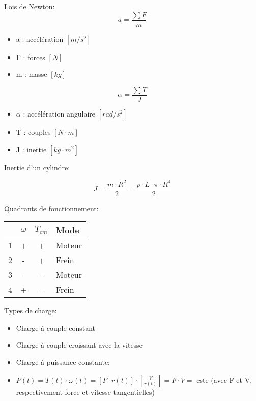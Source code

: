 \documentclass[10pt]{article} %
\begin{document}
\begin{multicols}{3}
\begin{flushleft}
				Lois de Newton:
				\[a = \frac{\sum F}{m}\]
				
				\begin{itemize}
					\item a : accélération $[m/s^2]$
					\item F : forces $[N]$
					\item m : masse $[kg]$
				\end{itemize}
		
				\[\alpha = \frac{\sum T}{J} \]
		
				\begin{itemize} 
					\item $\alpha$ : accélération angulaire $[rad/s^2]$
					\item T : couples $[N \cdot m]$
					\item J : inertie $[kg \cdot m^2]$
				\end{itemize}
		
				Inertie d'un cylindre:
				
				\[ J = \frac{m \cdot R^2}{2} = \frac{\rho \cdot L \cdot \pi \cdot R^4}{2} \]
				
				Quadrants de fonctionnement:
				
				\begin{table}[H]
				\begin{tabular}{|c|c|c|l|}
				\hline
					& $\omega$ & $T_{em}$ & Mode   \\ \hline
				1 & +        & +        & Moteur \\ \hline
				2 & -        & +        & Frein  \\ \hline
				3 & -        & -        & Moteur \\ \hline
				4 & +        & -        & Frein  \\ \hline
				\end{tabular}
				\centering
				\end{table}
				
				Types de charge:
				
				\begin{itemize}
					\item Charge à couple constant
					\item Charge à couple croissant avec la vitesse
					\item Charge à puissance constante:
					\item [] $P(t)=T(t) \cdot \omega(t)=[F \cdot r(t)] \cdot\left[\frac{V}{r(t)}\right]=F \cdot V=$ cste (avec F et V, respectivement force et vitesse tangentielles)
				\end{itemize}
				

\end{flushleft}
\end{multicols}
\end{document}
